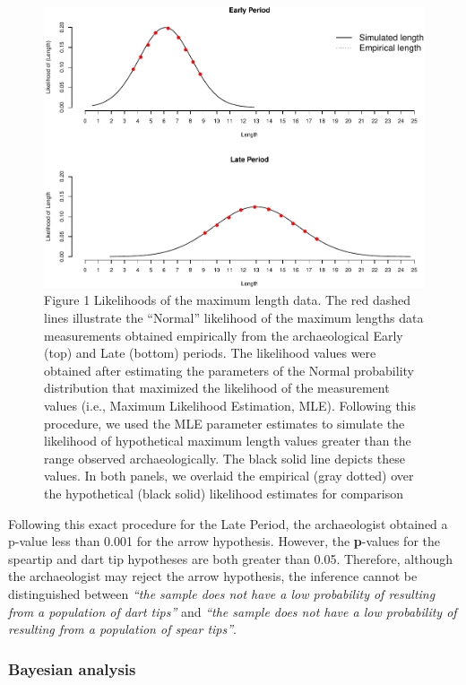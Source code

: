 \documentclass[
]{article}
\begin{document}
\begin{figure}
\centering
\includegraphics{The-Bayesian-Inferential-Paradigm-in-Archaeology-rmarkdown_files/figure-latex/Fig1-1.pdf}
\caption{Figure 1 Likelihoods of the maximum length data. The red dashed
lines illustrate the ``Normal'' likelihood of the maximum lengths data
measurements obtained empirically from the archaeological Early (top)
and Late (bottom) periods. The likelihood values were obtained after
estimating the parameters of the Normal probability distribution that
maximized the likelihood of the measurement values (i.e., Maximum
Likelihood Estimation, MLE). Following this procedure, we used the MLE
parameter estimates to simulate the likelihood of hypothetical maximum
length values greater than the range observed archaeologically. The
black solid line depicts these values. In both panels, we overlaid the
empirical (gray dotted) over the hypothetical (black solid) likelihood
estimates for comparison}
\end{figure}

Following this exact procedure for the Late Period, the archaeologist
obtained a p-value less than 0.001 for the arrow hypothesis. However,
the \textbf{p}-values for the speartip and dart tip hypotheses are both
greater than 0.05. Therefore, although the archaeologist may reject the
arrow hypothesis, the inference cannot be distinguished between
\emph{``the sample does not have a low probability of resulting from a
population of dart tips''} and \emph{``the sample does not have a low
probability of resulting from a population of spear tips''}.

\hypertarget{bayesian-analysis}{%
\subsubsection{Bayesian analysis}\label{bayesian-analysis}}
\end{document}
